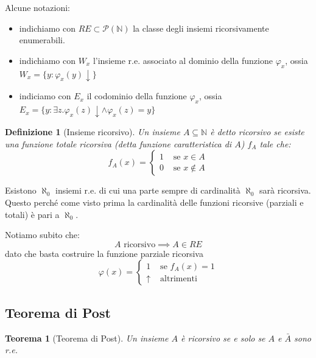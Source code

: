 \documentclass[a4paper,titlepage]{article}
\newtheorem{theorem}{Teorema}[section]
\newtheorem{definition}{Definizione}[section]
\theoremstyle{definition}
\newcommand{\N}{\mathbb{N}}
\begin{document}
Alcune notazioni:
\begin{itemize}
	\item indichiamo con $RE\subset\mathcal P(\N)$ la classe degli insiemi ricorsivamente enumerabili. 
	\item indichiamo con $W_x$ l'insieme r.e. associato al dominio della funzione $\varphi_x$, ossia $W_x=\{y:\varphi_x(y)\downarrow\}$ 
	\item indiciamo con $E_x$ il codominio della funzione $\varphi_x$, ossia $E_x=\{y:\exists z.\varphi_x(z)\downarrow\land\varphi_x(z)=y\}$ 
\end{itemize}
\begin{definition}[Insieme ricorsivo]
	Un insieme $A\subseteq\N$ è detto ricorsivo se esiste una funzione totale ricorsiva (detta funzione caratteristica di $A$) $f_A$ tale che:
	\[    	
		f_A(x) =
		\begin{cases}
		    	1 &\text{ se } x\in A\\
		    	0 &\text{ se } x\notin A
		\end{cases}
	\]
\end{definition}

Esistono $\aleph_0$ insiemi r.e. di cui una parte sempre di cardinalità $\aleph_0$ sarà ricorsiva. Questo perché come visto prima la cardinalità delle funzioni ricorsive (parziali e totali) è pari a $\aleph_0$.

Notiamo subito che: 
\[
	A\text{ ricorsivo}\implies A\in RE
\] 
dato che basta costruire la funzione parziale ricorsiva
\[
	\varphi(x) =
	\begin{cases}
		1 &\text{ se } f_A(x) = 1\\
		\uparrow &\text{ altrimenti}
	\end{cases}
\]

\subsection{Teorema di Post}
\begin{theorem}[Teorema di Post]
	Un insieme $A$ è ricorsivo se e solo se $A$ e $\bar A$ sono r.e.
\end{theorem}
\end{document}

